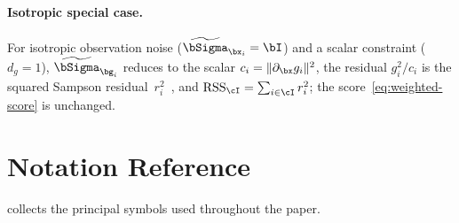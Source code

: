 \documentclass{article}
\DeclareMathOperator{\RSS}{RSS}
\newcommand{\btSigma}{\widetilde{\bSigma}}  %
\begin{document}
	\paragraph{Isotropic special case.}
	For isotropic observation noise ($\btSigma_{\bx_i} = \bI$) and a
	scalar constraint ($d_g = 1$),
	$\btSigma_{\bg_i}$ reduces to the scalar
	$c_i = \|\pdv{g_i}!{\bx}\|^2$, the residual
	$g_i^2/c_i$ is the squared Sampson
	residual~$r_i^2$~\cite{Hartley2003,Chum2005}, and
	$\RSS_\cI = \sum_{i\in\cI} r_i^2$;
	the score~\eqref{eq:weighted-score} is unchanged.

	\section{Notation Reference}
	\label{sec:supp-notation}

	 collects the principal symbols used
	throughout the paper.
\end{document}
